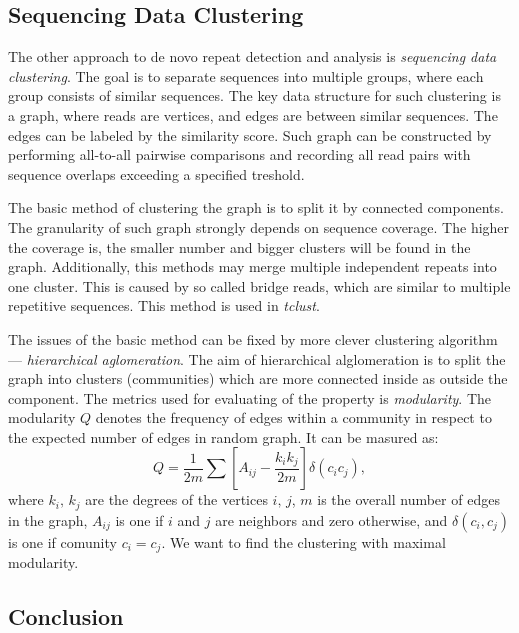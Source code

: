 \subsection{Sequencing Data Clustering}

The other approach to de novo repeat detection and analysis is \emph{sequencing data clustering}. The goal is to separate sequences into multiple groups, where each group consists of similar sequences.
The key data structure for such clustering is a graph, where reads are vertices, and edges are between similar sequences. The edges can be labeled by the similarity score. Such graph can be constructed by performing all-to-all pairwise comparisons and recording all read pairs with sequence overlaps exceeding a specified treshold\cite{pertea2003tigr, novak2010graph}. 

The basic method of clustering the graph is to split it by connected components. The granularity of such graph strongly depends on sequence coverage. The higher the coverage is, the smaller number and bigger clusters will be found in the graph. Additionally, this methods may merge multiple independent repeats into one cluster. This is caused by so called bridge reads, which are similar to multiple repetitive sequences. This method is used in \emph{tclust}\cite{pertea2003tigr}.

The issues of the basic method can be fixed by more clever clustering algorithm --- \emph{hierarchical aglomeration}. The aim of hierarchical alglomeration is to split the graph into clusters (communities) which are more connected inside as outside the component. The metrics used for evaluating of the property is \emph{modularity}.
The modularity $Q$ denotes the frequency of edges within a community in respect to the expected number of edges in random graph. It can be masured as:
$$Q = \frac{1}{2m}\sum\left[A_{ij}-\frac{k_i k_j}{2m}\right] \delta(c_i c_j),$$
where $k_i,\, k_j$ are the degrees of the vertices $i,\,j$, $m$ is the overall number of edges in the graph, $A_{ij}$ is one if $i$ and $j$ are neighbors and zero otherwise, and $\delta(c_i, c_j)$ is one if comunity $c_i = c_j$.
We want to find the clustering with maximal modularity.





\subsection{Conclusion}

